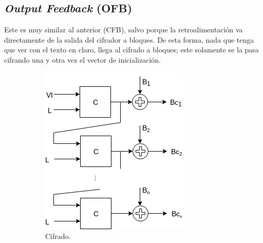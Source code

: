 %
%

\newpage
\subsection{\textit{Output Feedback} (OFB)}

Este es muy similar al anterior (CFB), salvo porque la retroalimentación va
directamente de la salida del cifrador a bloques. De esta forma, nada que
tenga que ver con el texto en claro, llega al cifrado a bloques; este
solamente se la pasa cifrando una y otra vez el vector de inicialización.

\vspace{0.5cm}

\begin{figure}[H]
  \centering
  \begin{subfigure}{0.45\textwidth}
      \begin{center}
          \includegraphics[width=0.7\linewidth]
            {contenidos/antecedentes/modos/diagramas/modo_ofb.png}
          \caption{Cifrado.}
      \end{center}
  \end{subfigure}
  \begin{subfigure}{0.45\textwidth}
      \begin{center}

\end{center}
\end{subfigure}
\end{figure}
